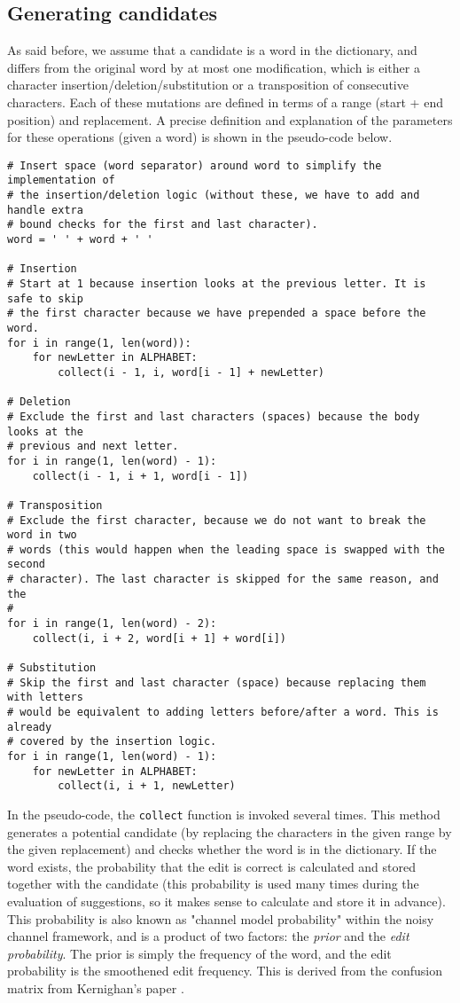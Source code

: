 \documentclass[11pt,a4paper]{article}
\begin{document}
\subsection{Generating candidates}\label{generateCandidateWords}
As said before, we assume that a candidate is a word in the dictionary, and differs from the original word by at most one modification, which is either a character insertion/deletion/substitution or a transposition of consecutive characters.
Each of these mutations are defined in terms of a range (start + end position) and replacement.
A precise definition and explanation of the parameters for these operations (given a word) is shown in the pseudo-code below.

\begin{lstlisting}
# Insert space (word separator) around word to simplify the implementation of
# the insertion/deletion logic (without these, we have to add and handle extra
# bound checks for the first and last character).
word = ' ' + word + ' '

# Insertion
# Start at 1 because insertion looks at the previous letter. It is safe to skip
# the first character because we have prepended a space before the word.
for i in range(1, len(word)):
    for newLetter in ALPHABET:
        collect(i - 1, i, word[i - 1] + newLetter)

# Deletion
# Exclude the first and last characters (spaces) because the body looks at the
# previous and next letter.
for i in range(1, len(word) - 1):
    collect(i - 1, i + 1, word[i - 1])

# Transposition
# Exclude the first character, because we do not want to break the word in two
# words (this would happen when the leading space is swapped with the second
# character). The last character is skipped for the same reason, and the
# 
for i in range(1, len(word) - 2):
    collect(i, i + 2, word[i + 1] + word[i])

# Substitution
# Skip the first and last character (space) because replacing them with letters
# would be equivalent to adding letters before/after a word. This is already
# covered by the insertion logic.
for i in range(1, len(word) - 1):
    for newLetter in ALPHABET:
        collect(i, i + 1, newLetter)
\end{lstlisting}

In the pseudo-code, the \texttt{collect} function is invoked several times.
This method generates a potential candidate (by replacing the characters in the given range by the given replacement) and checks whether the word is in the dictionary.
If the word exists, the probability that the edit is correct is calculated and stored together with the candidate (this probability is used many times during the evaluation of suggestions, so it makes sense to calculate and store it in advance).
This probability is also known as "channel model probability" within the noisy channel framework, and is a product of two factors: the \textit{prior} and the \textit{edit probability}.
The prior is simply the frequency of the word, and the edit probability is the smoothened edit frequency. This is derived from the confusion matrix from Kernighan's paper \cite{ref:confusion}.
\end{document}
